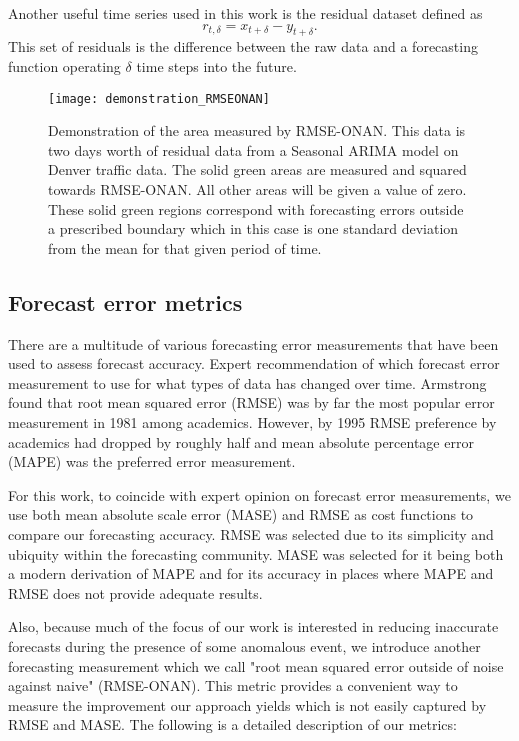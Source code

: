 Another useful time series used in this work is the residual dataset defined as
\begin{equation}
r_{t,\delta} =  x_{t + \delta} - y_{t + \delta}.
\end{equation}
This set of residuals is the difference between the raw data and a forecasting function operating $\delta$ time steps into the future. 


\begin{figure}[!t]
	\begin{center}
		\texttt{[image: demonstration\_RMSEONAN]}
	\end{center}
	\caption{Demonstration of the area measured by RMSE-ONAN.  This data is two days worth of residual data from a Seasonal ARIMA model on Denver traffic data.  The solid green areas are measured and squared towards RMSE-ONAN.  All other areas will be given a value of zero.  These solid green regions correspond with forecasting errors outside a prescribed boundary which in this case is one standard deviation from the mean for that given period of time.}
	\label{fig:dem_RMSEONAN}
\end{figure}

\subsection{Forecast error metrics}
There are a multitude of various forecasting error measurements that have been used to assess forecast accuracy.  Expert recommendation of which forecast error measurement to use for what types of data has changed over time.  Armstrong \cite{Armstrong2001, Yokuma1995} found that root mean squared error (RMSE) was by far the most popular error measurement in 1981 among academics.  However, by 1995 RMSE preference by academics had dropped by roughly half and mean absolute percentage error (MAPE) was the preferred error measurement. 

For this work, to coincide with expert opinion on forecast error measurements, we use both mean absolute scale error (MASE) \cite{Hyndman2006, Hyndman2006a} and RMSE as cost functions to compare our forecasting accuracy.  RMSE was selected due to its simplicity and ubiquity within the forecasting community.  MASE was selected for it being both a modern derivation of MAPE and for its accuracy in places where MAPE and RMSE does not provide adequate results.  

Also, because much of the focus of our work is interested in reducing inaccurate forecasts during the presence of some anomalous event, we introduce another forecasting measurement which we call "root mean squared error outside of noise against naive" (RMSE-ONAN).  This metric provides a convenient way to measure the improvement our approach yields which is not easily captured by RMSE and MASE.  The following is a detailed description of our metrics:

